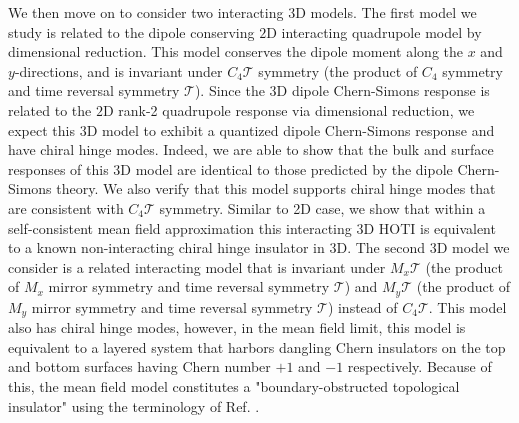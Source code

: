 \documentclass[prb,aps,twocolumn,groupaddress,floatfix]{revtex4-1}
\begin{document}
We then move on to consider two interacting $3$D models. The first model we study is related to the dipole conserving $2$D interacting quadrupole model  by dimensional reduction. This model conserves the dipole moment along the $x$ and $y$-directions, and is invariant under $C_4\mathcal{T}$ symmetry (the product of $C_4$ symmetry and time reversal symmetry $\mathcal{T}$).
Since the $3$D dipole Chern-Simons response is related to the $2$D rank-2 quadrupole response via dimensional reduction\cite{you2019}, we expect this $3$D model to exhibit a quantized dipole Chern-Simons response and have chiral hinge modes. 
Indeed, we are able to show that the bulk and surface responses of this $3$D model are identical to those predicted by the dipole Chern-Simons theory. We also verify that this model supports chiral hinge modes that are consistent with $C_4\mathcal{T}$ symmetry. Similar to 2D case, we show that within a self-consistent mean field approximation this interacting $3$D HOTI is equivalent to a known non-interacting chiral hinge insulator in $3$D. The second $3$D model  we consider is a related interacting model that is invariant under $M_x\mathcal{T}$ (the product of $M_x$ mirror symmetry and time reversal symmetry $\mathcal{T}$) and $M_y\mathcal{T}$ (the product of $M_y$ mirror symmetry and time reversal symmetry $\mathcal{T}$) instead of $C_4\mathcal{T}$. This model also has chiral hinge modes, however, in the mean field limit, this model is equivalent to a layered system that harbors dangling Chern insulators on the top and bottom surfaces having Chern number $+1$ and $-1$ respectively. Because of this, the mean field model constitutes a "boundary-obstructed topological insulator" using the terminology of Ref. .
\end{document}
